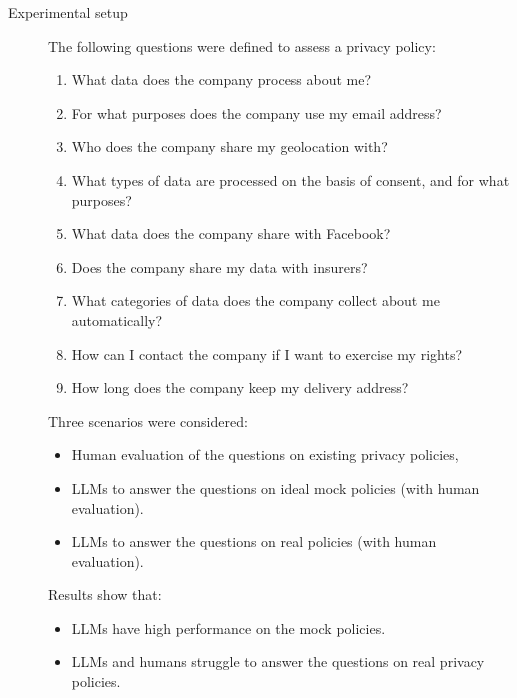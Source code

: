 \begin{description}
    \item[Experimental setup]
        The following questions were defined to assess a privacy policy:
        \begin{enumerate}
            \item What data does the company process about me?
            \item For what purposes does the company use my email address?
            \item Who does the company share my geolocation with?
            \item What types of data are processed on the basis of consent, and for what purposes?
            \item What data does the company share with Facebook?
            \item Does the company share my data with insurers?
            \item What categories of data does the company collect about me automatically?
            \item How can I contact the company if I want to exercise my rights?
            \item How long does the company keep my delivery address?
        \end{enumerate}

        Three scenarios were considered:
        \begin{itemize}
            \item Human evaluation of the questions on existing privacy policies,
            \item LLMs to answer the questions on ideal mock policies (with human evaluation).
            \item LLMs to answer the questions on real policies (with human evaluation).
        \end{itemize}

        Results show that:
        \begin{itemize}
            \item LLMs have high performance on the mock policies.
            \item LLMs and humans struggle to answer the questions on real privacy policies.
        \end{itemize}
\end{description}